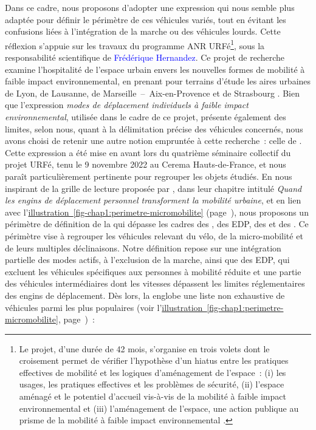 \begin{refsegment}
Dans ce cadre, nous proposons d’adopter une expression qui nous semble plus adaptée pour définir le périmètre de ces véhicules variés, tout en évitant les confusions liées à l’intégration de la marche ou des véhicules lourds. Cette réflexion s’appuie sur les travaux du programme ANR \acrfull{URFé}\footnote{
    Le projet, d'une durée de 42 mois, s’organise en trois volets dont le croisement permet de vérifier l’hypothèse d’un hiatus entre les pratiques effectives de mobilité et les logiques d’aménagement de l’espace~: (i) les usages, les pratiques effectives et les problèmes de sécurité, (ii) l'espace aménagé et le potentiel d'accueil vis-à-vis de la mobilité à faible impact environnemental et (iii) l'aménagement de l'espace, une action publique au prisme de la mobilité à faible impact environnemental \textcolor{blue}{\autocite{urfe_projet_2022}}.
}, sous la responsabilité scientifique de \textcolor{blue}{Frédérique Hernandez}. Ce projet de recherche examine l’hospitalité de l’espace urbain envers les nouvelles formes de mobilité à faible impact environnemental, en prenant pour terrains d’étude les aires urbaines de Lyon, de Lausanne, de Marseille~–~Aix-en-Provence et de Strasbourg \textcolor{blue}{\autocite{urfe_projet_2022}}. Bien que l’expression \textsl{modes de déplacement individuels à faible impact environnemental}, utilisée dans le cadre de ce projet, présente également des limites, selon nous, quant à la délimitation précise des véhicules concernés, nous avons choisi de retenir une autre notion empruntée à cette recherche~: celle de . Cette expression a été mise en avant lors du quatrième séminaire collectif du projet \acrshort{URFé}, tenu le 9 novembre 2022 au \acrshort{Cerema} Hauts-de-France, et nous paraît particulièrement pertinente pour regrouper les objets étudiés. En nous inspirant de la grille de lecture proposée par \textcolor{blue}{\textcite[61]{rabaud_quand_2022}}, dans leur chapitre intitulé \textsl{Quand les engins de déplacement personnel transforment la mobilité urbaine}, et en lien avec l’\hyperref[fig-chap1:perimetre-micromobilite]{illustration~\ref{fig-chap1:perimetre-micromobilite}} (page~\pageref{fig-chap1:perimetre-micromobilite}), nous proposons un périmètre de définition de la  qui dépasse les cadres des , des \acrshort{EDP}, des  et des . Ce périmètre vise à regrouper les véhicules relevant du vélo, de la micro-mobilité et de leurs multiples déclinaisons. Notre définition repose sur une intégration partielle des \gls{modes actifs}, à l’exclusion de la marche, ainsi que des \acrshort{EDP}, qui excluent les véhicules spécifiques aux personnes à mobilité réduite et une partie des véhicules intermédiaires dont les vitesses dépassent les limites réglementaires des engins de déplacement. Dès lors, la  englobe une liste non exhaustive de véhicules parmi les plus populaires (voir  l’\hyperref[fig-chap1:perimetre-micromobilite]{illustration~\ref{fig-chap1:perimetre-micromobilite}}, page~\pageref{fig-chap1:perimetre-micromobilite})~:

\end{refsegment}

